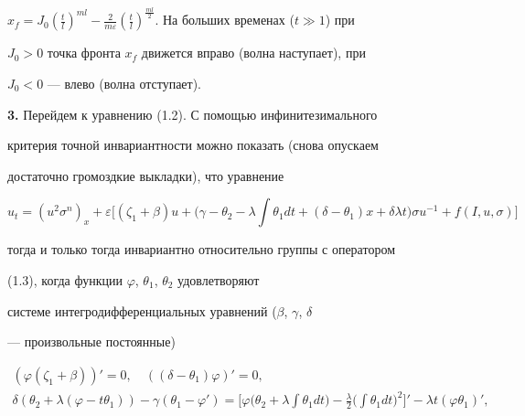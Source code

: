 $x_f=J_0(\frac{t}{l})^{ml}-\frac{2}{m\varepsilon} 


(\frac{t}{l})^{\frac{ml}{2}}$. На больших временах ($t\gg1$) при 


$J_0>0$ точка фронта $x_f$ движется вправо (волна наступает), при 


$J_0<0$ --- влево (волна отступает). 


\medskip 


 


{\bf 3.} Перейдем к уравнению (1.2). С помощью инфинитезимального 


критерия точной инвариантности можно показать (снова опускаем 


достаточно громоздкие выкладки), что уравнение 


\begin{equation} 


u_t=(u^2\sigma^n)_x+\varepsilon\bigg[(\zeta_1+\beta)u+ 


\bigg(\gamma-\theta_2-\lambda\int\theta_1dt+(\delta-\theta_1)x+ 


\delta\lambda t\bigg)\sigma u^{-1}+f(I,u,\sigma)\bigg] 


\tag{3.1} 


\end{equation} 


тогда и только тогда инвариантно относительно группы с оператором 


(1.3), когда функции $\varphi$, $\theta_1$, $\theta_2$ удовлетворяют 


системе интегродифференциальных уравнений ($\beta$, $\gamma$, $\delta$ 


--- произвольные постоянные) 


\begin{gather} 


(\varphi(\zeta_1+\beta))'=0,\quad 


((\delta-\theta_1)\varphi)'=0,\tag{3.2} \\ 


% 


\delta(\theta_2+\lambda(\varphi-t\theta_1))- 


\gamma(\theta_1-\varphi')=\bigg[\varphi\bigg(\theta_2+\lambda 


\int\theta_1dt\bigg)-\frac{\lambda}{2}\bigg(\int\theta_1dt 


\bigg)^2\bigg]'-\lambda t(\varphi\theta_1)',\tag{3.3} 


\end{gather} 


